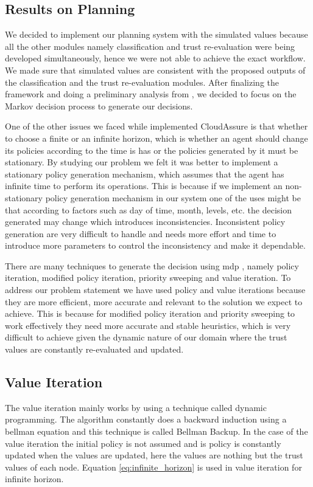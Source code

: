 \subsection{Results on Planning}
We decided to implement our planning system with the
simulated values because all the other modules namely classification and trust
re-evaluation were being developed simultaneously, hence we were not able to
achieve the exact workflow. We made sure that simulated values are consistent
with the proposed outputs of the classification and the trust re-evaluation
modules. After finalizing the framework and doing a preliminary analysis from
\autocite{Norvig2012}, we decided to focus on the Markov decision process to generate our
decisions.  

One of the other issues we faced while implemented CloudAssure is that whether to choose a finite or an infinite horizon, which is
whether an agent should change its policies according to the time is has or the
policies generated by it must be stationary. By studying our problem we felt it
was better to implement a stationary policy generation mechanism, which assumes
that the agent has infinite time to perform its operations. This is because if
we implement an non-stationary policy generation mechanism in our system one of
the uses might be that according to factors such as day of time, month, levels,
etc. the decision generated may change which introduces inconsistencies.
Inconsistent policy generation are very difficult to handle and needs more
effort and time to introduce more parameters to control the inconsistency and
make it dependable.  

There are many techniques to generate the decision using
\gls{mdp} \autocite{Wikipedia2013}, namely policy iteration, modified policy iteration, priority sweeping
and value iteration. To address our problem statement we have used policy and
value iterations because they are more efficient, more accurate and relevant to
the solution we expect to achieve. This is because for modified policy iteration
and priority sweeping to work effectively they need more accurate and stable
heuristics, which is very difficult to achieve given the dynamic nature of our
domain where the trust values are constantly re-evaluated and updated. 

\subsection{Value Iteration}
The value iteration mainly works by using a technique called dynamic
programming. The algorithm constantly does a backward induction using a bellman
equation \autocite{Wikipedia2013} and this technique is called Bellman Backup. In the case of the
value iteration the initial policy is not assumed and is policy is constantly
updated when the values are updated, here the values are nothing but the trust
values of each node.  Equation \ref{eq:infinite_horizon} is used in value iteration for infinite
horizon.

